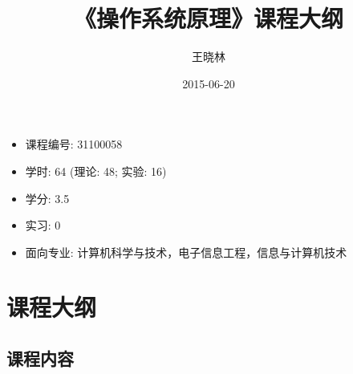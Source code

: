 \documentclass{wx672article}
\author{王晓林}
\date{2015-06-20}
\title{《操作系统原理》课程大纲}
\begin{document}
\maketitle
\tableofcontents
\clearpage

\begin{itemize}
\item 课程编号: 31100058
\item 学时: 64 (理论: 48; 实验: 16)
\item 学分: 3.5
\item 实习: 0
\item 面向专业: 计算机科学与技术，电子信息工程，信息与计算机技术
\end{itemize}

\section{课程大纲}
\label{sec-1}

\subsection{课程内容}
\label{sec-1-1}
\end{document}
